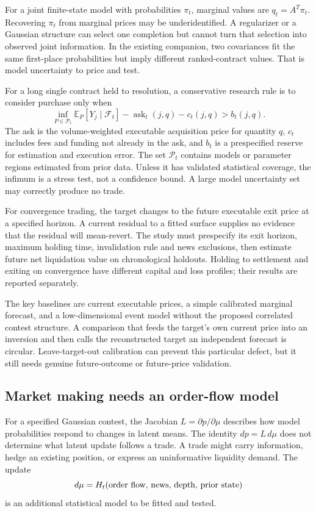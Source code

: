 \documentclass[11pt]{article}
\newcommand{\E}{\mathbb E}
\theoremstyle{remark}\newtheorem{example}{Example}
\begin{document}
For a joint finite-state model with probabilities $\pi_t$, marginal values are
$q_t=A^T\pi_t$. Recovering $\pi_t$ from marginal prices may be underidentified.
A regularizer or a Gaussian structure can select one completion but cannot
turn that selection into observed joint information. In the existing companion,
two covariances fit the same first-place probabilities but imply different
ranked-contract values. That is model uncertainty to price and test.

For a long single contract held to resolution, a conservative research rule is
to consider purchase only when
\begin{equation}\label{eq:robustentry}
 \inf_{P\in\mathcal P_t}\E_P[Y_j\mid\mathcal F_t]
   -\operatorname{ask}_t(j,q)-c_t(j,q)>b_t(j,q).
\end{equation}
The ask is the volume-weighted executable acquisition price for quantity $q$,
$c_t$ includes fees and funding not already in the ask, and $b_t$ is a
prespecified reserve for estimation and execution error. The set $\mathcal P_t$
contains models or parameter regions estimated from prior data. Unless it has
validated statistical coverage, the infimum is a stress test, not a confidence
bound. A large model uncertainty set may correctly produce no trade.

For convergence trading, the target changes to the future executable exit
price at a specified horizon. A current residual to a fitted surface supplies
no evidence that the residual will mean-revert. The study must prespecify its
exit horizon, maximum holding time, invalidation rule and news exclusions, then
estimate future net liquidation value on chronological holdouts. Holding to
settlement and exiting on convergence have different capital and loss profiles;
their results are reported separately.

The key baselines are current executable prices, a simple calibrated marginal
forecast, and a low-dimensional event model without the proposed correlated
contest structure. A comparison that feeds the target's own current price into
an inversion and then calls the reconstructed target an independent forecast
is circular. Leave-target-out calibration can prevent this particular defect,
but it still needs genuine future-outcome or future-price validation.

\subsection{Market making needs an order-flow model}
For a specified Gaussian contest, the Jacobian $L=\partial p/\partial\mu$
describes how model probabilities respond to changes in latent means. The
identity $dp=L\,d\mu$ does not determine what latent update follows a trade.
A trade might carry information, hedge an existing position, or express an
uninformative liquidity demand. The update
\begin{equation}
 d\mu=H_t(\hbox{order flow, news, depth, prior state})
\end{equation}
is an additional statistical model to be fitted and tested.
\end{document}
